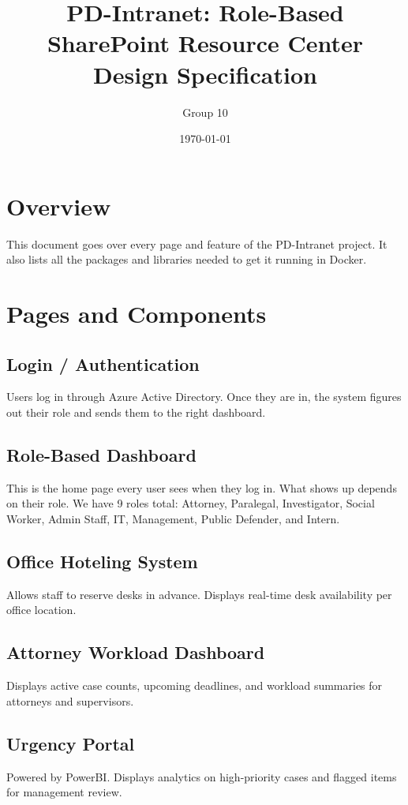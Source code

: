 \documentclass[12pt]{article}
\title{PD-Intranet: Role-Based SharePoint Resource Center \\ \large Design Specification}
\author{Group 10}
\date{\today}
\begin{document}
\maketitle
\tableofcontents
\newpage

\section{Overview}
This document goes over every page and feature of the PD-Intranet project. It also lists all the packages and libraries needed to get it running in Docker.

\section{Pages and Components}

\subsection{Login / Authentication}
Users log in through Azure Active Directory. Once they are in, the system figures out their role and sends them to the right dashboard.

\subsection{Role-Based Dashboard}
This is the home page every user sees when they log in. What shows up depends on their role. We have 9 roles total: Attorney, Paralegal, Investigator, Social Worker, Admin Staff, IT, Management, Public Defender, and Intern.

\subsection{Office Hoteling System}
Allows staff to reserve desks in advance. Displays real-time desk availability per office location.

\subsection{Attorney Workload Dashboard}
Displays active case counts, upcoming deadlines, and workload summaries for attorneys and supervisors.

\subsection{Urgency Portal}
Powered by PowerBI. Displays analytics on high-priority cases and flagged items for management review.
\end{document}
